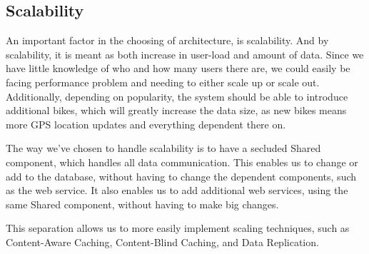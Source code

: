 \subsection{Scalability}
An important factor in the choosing of architecture, is scalability.
And by scalability, it is meant as both increase in user-load and amount of data.
Since we have little knowledge of who and how many users there are, we could easily be facing performance problem and needing to either scale up or scale out.
Additionally, depending on popularity, the system should be able to introduce additional bikes, which will greatly increase the data size, as new bikes means more GPS location updates and everything dependent there on.

The way we've chosen to handle scalability is to have a secluded Shared component, which handles all data communication.
This enables us to change or add to the database, without having to change the dependent components, such as the web service.
It also enables us to add additional web services, using the same Shared component, without having to make big changes.

This separation allows us to more easily implement scaling techniques, such as Content-Aware Caching, Content-Blind Caching, and Data Replication.\cite{scalability}